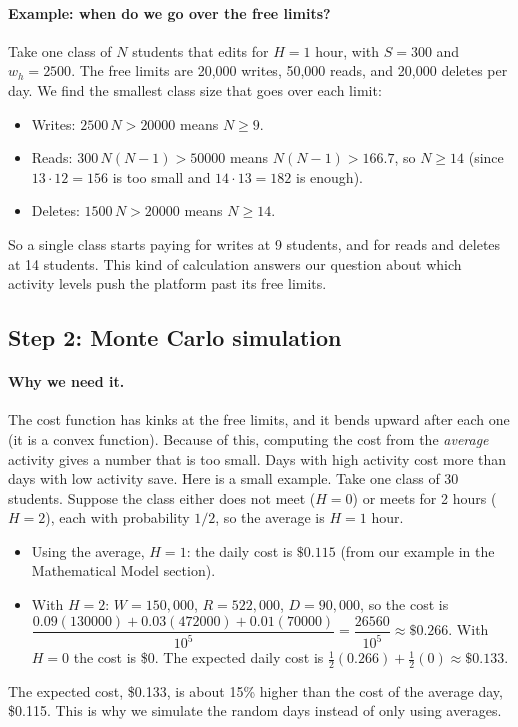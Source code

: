 \documentclass{article}
\begin{document}
\paragraph{Example: when do we go over the free limits?}
Take one class of $N$ students that edits for $H=1$ hour, with $S=300$ and $w_h=2500$. The free limits are 20{,}000 writes, 50{,}000 reads, and 20{,}000 deletes per day. We find the smallest class size that goes over each limit:
\begin{itemize}
    \item Writes: $2500\,N > 20000$ means $N \ge 9$.
    \item Reads: $300\,N(N-1) > 50000$ means $N(N-1) > 166.7$, so $N \ge 14$ (since $13\cdot 12 = 156$ is too small and $14 \cdot 13 = 182$ is enough).
    \item Deletes: $1500\,N > 20000$ means $N \ge 14$.
\end{itemize}
So a single class starts paying for writes at 9 students, and for reads and deletes at 14 students. This kind of calculation answers our question about which activity levels push the platform past its free limits.

\subsection{Step 2: Monte Carlo simulation}

\paragraph{Why we need it.}
The cost function has kinks at the free limits, and it bends upward after each one (it is a convex function). Because of this, computing the cost from the \emph{average} activity gives a number that is too small. Days with high activity cost more than days with low activity save. Here is a small example. Take one class of 30 students. Suppose the class either does not meet ($H=0$) or meets for 2 hours ($H=2$), each with probability $1/2$, so the average is $H=1$ hour.
\begin{itemize}
    \item Using the average, $H=1$: the daily cost is $\$0.115$ (from our example in the Mathematical Model section).
    \item With $H=2$: $W=150{,}000$, $R=522{,}000$, $D=90{,}000$, so the cost is $\dfrac{0.09(130000)+0.03(472000)+0.01(70000)}{10^5} = \dfrac{26560}{10^5} \approx \$0.266$. With $H=0$ the cost is \$0. The expected daily cost is $\tfrac12(0.266) + \tfrac12(0) \approx \$0.133$.
\end{itemize}
The expected cost, \$0.133, is about 15\% higher than the cost of the average day, \$0.115. This is why we simulate the random days instead of only using averages.
\end{document}
